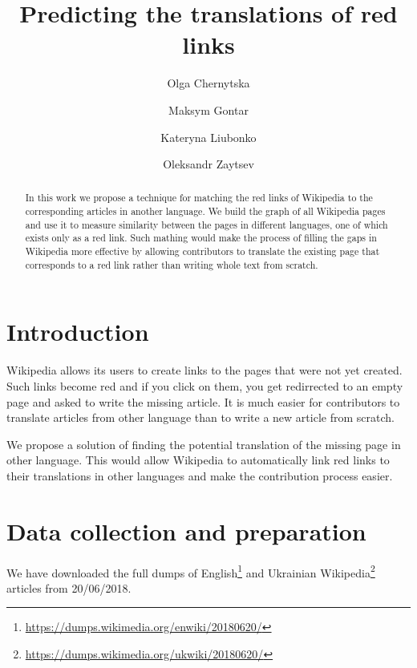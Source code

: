 \documentclass[11pt,a4paper]{article}
\begin{document}
\title{Predicting the translations of red links}
\date{}

\author[ ]{Olga Chernytska}
\author[ ]{Maksym Gontar}
\author[ ]{Kateryna Liubonko}
\author[ ]{Oleksandr Zaytsev}


\maketitle

\begin{abstract}
In this work we propose a technique for matching the red links of Wikipedia to the corresponding articles in another language. We build the graph of all Wikipedia pages and use it to measure similarity between the pages in different languages, one of which exists only as a red link. Such mathing would make the process of filling the gaps in Wikipedia more effective by allowing contributors to translate the existing page that corresponds to a red link rather than writing whole text from scratch.
\end{abstract}

\section{Introduction}

Wikipedia allows its users to create links to the pages that were not yet created. Such links become red and if you click on them, you get redirrected to an empty page and asked to write the missing article. It is much easier for contributors to translate articles from other language than to write a new article from scratch.

We propose a solution of finding the potential translation of the missing page in other language. This would allow Wikipedia to automatically link red links to their translations in other languages and make the contribution process easier.

\section{Data collection and preparation}

We have downloaded the full dumps of English\footnote{\url{https://dumps.wikimedia.org/enwiki/20180620/}} and Ukrainian Wikipedia\footnote{\url{https://dumps.wikimedia.org/ukwiki/20180620/}} articles from 20/06/2018. 
\end{document}
